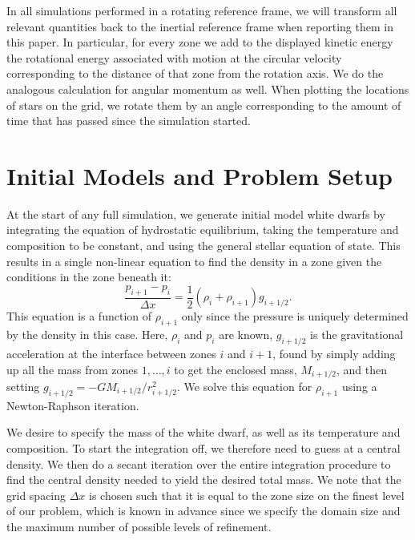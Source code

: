 \documentclass{emulateapj}
\begin{document}
In all simulations performed in a rotating reference frame, we will transform all relevant
quantities back to the inertial reference frame when reporting them in this paper. In particular,
for every zone we add to the displayed kinetic energy the rotational energy associated with motion 
at the circular velocity corresponding to the distance of that zone from the rotation axis.
We do the analogous calculation for angular momentum as well. When plotting the locations of 
stars on the grid, we rotate them by an angle corresponding to the amount of time that has 
passed since the simulation started.


\section{Initial Models and Problem Setup}
\label{sec:initial_models}

At the start of any full simulation, we generate initial model white
dwarfs by integrating the equation of hydrostatic equilibrium, taking
the temperature and composition to be constant, and using the general
stellar equation of state.  This results in a single non-linear
equation to find the density in a zone given the conditions in the
zone beneath it:
\begin{equation}
\frac{p_{i+1} - p_i}{\Delta x} = \frac{1}{2} (\rho_i + \rho_{i+1}) g_{i+1/2}.
\end{equation}
This equation is a function of $\rho_{i+1}$ only since the pressure is
uniquely determined by the density in this case. Here, $\rho_i$ and $p_i$
are known, $g_{i+1/2}$ is the gravitational acceleration at the
interface between zones $i$ and $i+1$, found by simply adding up all
the mass from zones $1, \ldots, i$ to get the enclosed mass,
$M_{i+1/2}$, and then setting $g_{i+1/2} =
-GM_{i+1/2}/r_{i+1/2}^2$. We solve this equation for $\rho_{i+1}$
using a Newton-Raphson iteration.

We desire to specify the mass of the white dwarf, as well as its
temperature and composition. To start the integration off, we
therefore need to guess at a central density.  We then do a secant
iteration over the entire integration procedure to find the central
density needed to yield the desired total mass.  We note that the grid
spacing $\Delta x$ is chosen such that it is equal to the zone size on
the finest level of our problem, which is known in advance since we
specify the domain size and the maximum number of possible levels of
refinement.
\end{document}
